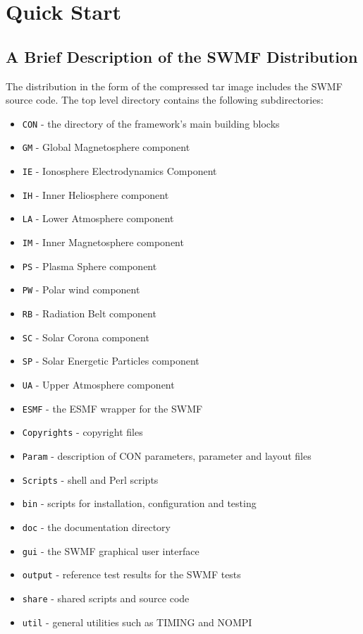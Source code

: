 \chapter{Quick Start}

\section{A Brief Description of the SWMF Distribution}

The distribution in the form of the compressed tar image
includes the SWMF source code.
The top level directory contains the following subdirectories:
\begin{itemize}\itemsep=0pt
\item {\tt CON}     - the directory of the framework's main building blocks
\item {\tt GM}      - Global Magnetosphere component       %
\item {\tt IE}      - Ionosphere Electrodynamics Component %
\item {\tt IH}      - Inner Heliosphere component          %
\item {\tt LA}      - Lower Atmosphere component           %
\item {\tt IM}      - Inner Magnetosphere component        %
\item {\tt PS}      - Plasma Sphere component              %
\item {\tt PW}      - Polar wind component                 %
\item {\tt RB}      - Radiation Belt component             %
\item {\tt SC}      - Solar Corona component               %
\item {\tt SP}      - Solar Energetic Particles component  %
\item {\tt UA}      - Upper Atmosphere component           %
\item {\tt ESMF}    - the ESMF wrapper for the SWMF
\item {\tt Copyrights} - copyright files
\item {\tt Param}   - description of CON parameters, parameter and layout files
\item {\tt Scripts} - shell and Perl scripts
\item {\tt bin}     - scripts for installation, configuration and testing
\item {\tt doc}     - the documentation directory %
\item {\tt gui}     - the SWMF graphical user interface
\item {\tt output}  - reference test results for the SWMF tests
\item {\tt share}   - shared scripts and source code
\item {\tt util}    - general utilities such as TIMING and NOMPI
\end{itemize}
